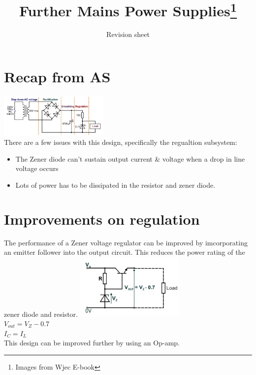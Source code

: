 \documentclass[a4paper, 11pt, twocolumn]{article}
\title{Further Mains Power Supplies\footnote{Images from Wjec E-book}}
\author{Revision sheet}
\date{}
\begin{document}
    
    \maketitle

    \section{Recap from AS}
    \includegraphics[width=0.4\textwidth]{recapFromAS.jpg} \\
    There are a few issues with this design, specifically the regualtion subsystem:
    \begin{itemize}
        \item The Zener diode can't sustain output current \& voltage when a drop in line voltage occurs
        \item Lots of power has to be dissipated in the resistor and zener diode.
    \end{itemize}

    \section{Improvements on regulation}
    The performance of a Zener voltage regulator can be improved by imcorporating an emitter follower into the output circuit. This reduces the power rating of the zener diode and resistor.
    \includegraphics[width=0.4\textwidth]{emitterFollower1.jpg} \\
    $V_{out} = V_Z - 0.7$\\
    $I_C = I_L$\\
    This design can be improved further by using an Op-amp.
\end{document}
